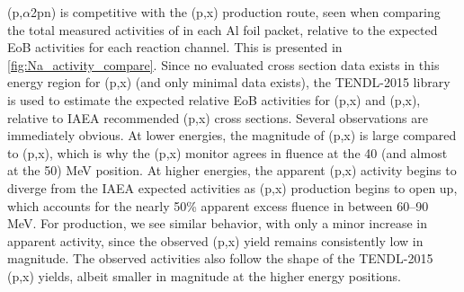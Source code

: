 (p,$\alpha$2pn) 
is competitive with the (p,x) 
production route,
seen when comparing the total measured activities of   
in each Al foil packet, 
relative to the expected EoB activities for each reaction channel.
This is presented in \autoref{fig:Na_activity_compare}.
Since no evaluated  cross section data exists in this energy region  for  (p,x)  (and only minimal  data exists),  the TENDL-2015 library is used to estimate the expected relative EoB activities for (p,x) and (p,x), 
relative to IAEA recommended (p,x) cross sections.
Several observations are immediately obvious.
At lower energies, the magnitude of (p,x) is large compared to (p,x), which is why the (p,x) monitor agrees in fluence at the 40 (and almost at the 50) MeV position.  
At higher energies, the apparent (p,x) activity begins to diverge from the IAEA expected activities as     (p,x) production begins to open up,  which accounts for the nearly 50\% apparent excess fluence in  between 60--90 MeV.
For   production, we see  similar behavior, with only a minor increase in apparent  activity,  since the observed (p,x) yield remains consistently low in magnitude.
The observed  activities also follow the shape of the TENDL-2015 (p,x) yields, albeit smaller in magnitude at the higher energy positions.




